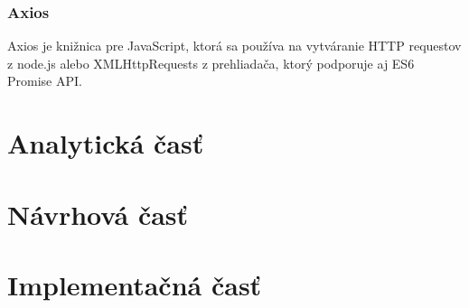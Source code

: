 \subsubsection{Axios}
Axios je knižnica pre JavaScript, ktorá sa používa na vytváranie HTTP requestov z node.js alebo XMLHttpRequests z prehliadača, ktorý podporuje aj ES6 Promise API. 








\section{Analytická časť}
\section{Návrhová časť}
\section{Implementačná časť}









